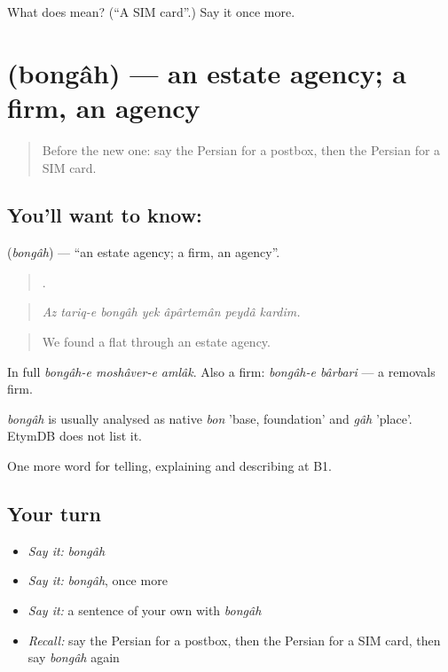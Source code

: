 \begin{tcolorbox}[breakable,colback=teal!4,colframe=teal!35!black,title={Before you move on}]
What does   mean? (\textquotedblleft{}A SIM card\textquotedblright{}.) Say it once more.
\end{tcolorbox}
\section[\texorpdfstring{\fa{بنگاه} (bongâh)}{بنگاه (bongâh)}]{ (bongâh) — an estate agency; a firm, an agency}

\label{lesson:FA-C456-bongah}



\begin{quote}
Before the new one: say the Persian for a postbox, then the Persian for a SIM card.
\end{quote}

\subsection*{You'll want to know: }
\textbf{} (\emph{bongâh}) — \textquotedblleft{}an estate agency; a firm, an agency\textquotedblright{}.

\begin{quote}
      .
\end{quote}

\begin{quote}
\emph{Az tariq-e bongâh yek âpârtemân peydâ kardim.}
\end{quote}

\begin{quote}
We found a flat through an estate agency.
\end{quote}

In full \emph{bongâh-e moshâver-e amlâk}. Also a firm: \emph{bongâh-e bârbari} — a removals firm.

\begin{cousinweb}
\emph{bongâh} is usually analysed as native \emph{bon} 'base, foundation' and \emph{gâh} 'place'. EtymDB does not list it.
\end{cousinweb}

\begin{grammarlens}[title={What you've built}]
One more word for telling, explaining and describing at B1.
\end{grammarlens}

\subsection*{Your turn}
\begin{itemize}
\raggedright
  \item \emph{Say it:} \emph{bongâh}
  \item \emph{Say it:} \emph{bongâh}, once more
  \item \emph{Say it:} a sentence of your own with \emph{bongâh}
  \item \emph{Recall:} say the Persian for a postbox, then the Persian for a SIM card, then say \emph{bongâh} again
\end{itemize}

